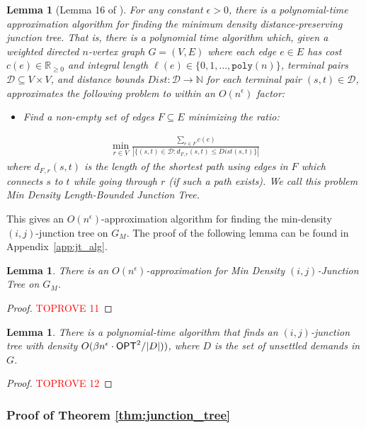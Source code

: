 \documentclass{article}
\newtheorem{lemma}[theorem]{Lemma}
\theoremstyle{definition}
\theoremstyle{remark}
\newcommand{\poly}{\texttt{poly}}
\def\opt {{\sf OPT}}
\def\jt {{\sc Min Density $(i,j)$-Junction Tree}}
\def\ljt {{\sc Min Density Length-Bounded Junction Tree}}
\begin{document}
\begin{lemma}[Lemma 16 of \cite{GKL23}]
\label{lem:og_JT_alg}
    For any constant $\epsilon > 0$, there is a polynomial-time approximation algorithm for finding the minimum density distance-preserving junction tree. That is, there is a polynomial time algorithm which, given a weighted directed $n$-vertex graph $G = (V,E)$ where each edge $e \in E$ has cost $c(e) \in \mathbb{R}_{\geq 0}$ and integral length $\ell(e) \in \{0,1, \dots, \poly(n)\}$, terminal pairs $\mathcal{D} \subseteq V \times V$, and distance bounds $Dist : \mathcal{D} \rightarrow \mathbb{N}$ for each terminal pair $(s,t) \in \mathcal{D}$, approximates the following problem to within an $O(n^\epsilon)$ factor:
    \begin{itemize}
        \item Find a non-empty set of edges $F \subseteq E$ minimizing the ratio:
    \end{itemize}
    \begin{align*}
        \min_{r \in V} \frac{\sum_{e \in F} c(e)}{|\{(s,t) \in \mathcal{D} : d_{F,r}(s,t) \leq Dist(s,t) \}|}
    \end{align*}
    where $d_{F,r}(s,t)$ is the length of the shortest path using edges in $F$ which connects $s$ to $t$ while going through $r$ (if such a path exists). We call this problem {\ljt}.
\end{lemma}

This gives an $O(n^\epsilon)$-approximation algorithm for finding the min-density $(i,j)$-junction tree on $G_M$. \iflong \else The proof of the following lemma can be found in Appendix~\ref{app:jt_alg}. \fi

\begin{lemma}
\label{lem:hop_JT_approx}
    There is an $O(n^\epsilon)$-approximation for {\jt} on $G_M$.
\end{lemma}
\iflong 
\begin{proof}\textcolor{red}{TOPROVE 11}\end{proof}
\else
\fi

\begin{lemma}
\label{lem:hop_JT_alg}
    There is a polynomial-time algorithm that finds an $(i,j)$-junction tree with density $O(\beta n^\epsilon \cdot {{\opt}}^2 / |D|) )$, where $D$ is the set of unsettled demands in $G$.
\end{lemma}
\begin{proof}\textcolor{red}{TOPROVE 12}\end{proof}

\subsubsection{Proof of Theorem \ref{thm:junction_tree}}
\end{document}
